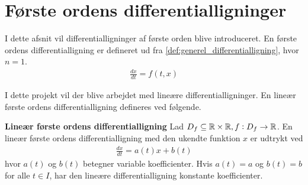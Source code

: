 \section{Første ordens differentialligninger}

I dette afsnit vil differentialligninger af første orden blive introduceret. 
En første ordens differentialligning er defineret ud fra \autoref{def:generel_differentialligning}, hvor $n=1$. 
\begin{align}
    \frac{dx}{dt}=f(t,x)  
\end{align}

I dette projekt vil der blive arbejdet med lineære differentialligninger. En lineær første ordens differentialligning defineres ved følgende. \\
\begin{minipage}\textwidth
\begin{defn} \textbf{Lineær første ordens differentialligning} %
\newline
Lad $D_f \subseteq \mathbb{R} \times \mathbb{R}, f: D_f \rightarrow \mathbb{R}$. En lineær første ordens differentialligning med den ukendte funktion $x$ er udtrykt ved
\begin{align}
    \frac{dx}{dt}=a(t)x+b(t)
\end{align}
hvor $a(t)$ og $b(t)$ betegner variable koefficienter. Hvis $a(t)=a$ og $b(t)=b$ for alle $t\in I$, har den lineære differentialligning konstante koefficienter.
\end{defn}
\end{minipage}





